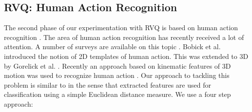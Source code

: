 \documentclass[12pt,letterpaper,doublespaced,ETD,proposal]{gt-ece-thesis}
\begin{document}
\begin{Body}
\subsection{RVQ: Human Action Recognition}
The second phase of our experimentation with RVQ is based on human action recognition \cite{2010_CNF_HMMRVQ_Aslam}.  The area of human action recognition has recently received a lot of attention.  A number of surveys are available on this topic \cite{1995_JNL_SURVEYmotion_Cedras,1999_JNL_SURVEYmotion_Aggarwal,1999_JNL_SURVEYmotion_Gavrila,1999_REP_SURVEYmotion_Moeslund,2001_JNL_SURVEYmotion_Moeslund,2003_JNL_SURVEYiu_Buxton,2003_JNL_SURVEYmotion_LWang,2003_JNL_SURVEYbeh_Shah,2003_JNL_SURVEYmotion_Wang,2004_CNF_SURVEYaction_Aggarwal,2004_JNL_SURVEYiu_Hu,2004_CNF_SURVEYgait_Nixon,2004_CNF_Survey3DshapeRetrieval,2006_JNL_HumanMotion_Moeslund,2007_JNL_HumanMotion_Poppe,2008_CNF_SurveyHumanActivityRecognition_Ahad,2010_JNL_SURVEYmotion_Ji}.  Bobick et al. \cite{2001_JNL_MotionTemplates_Bobick} introduced the notion of 2D templates of human action.  This was extended to 3D by Gorelick et al. \cite{2007_JNL_SpaceTimeShapes_Gorelick}.  Recently an approach based on kinematic features of 3D motion was used to recognize human action \cite{2010_JNL_ActionReconKinematic_Ali}.  Our approach to tackling this problem is similar to \cite{2007_JNL_SpaceTimeShapes_Gorelick} in the sense that extracted features are used for classification using a simple Euclidean distance measure.  We use a four step approach:  


\end{Body}
\end{document}
